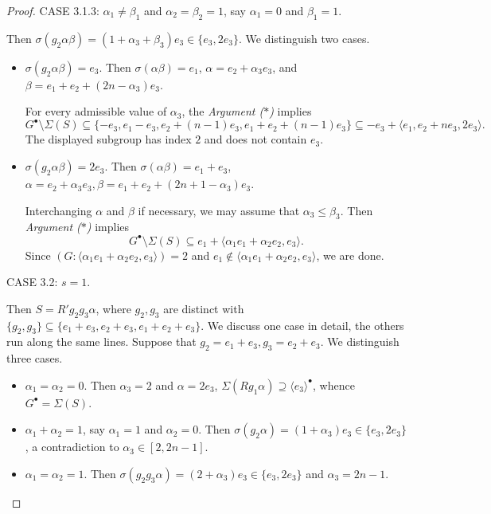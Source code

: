 \documentclass[a4paper, 10pt]{amsart}
\theoremstyle{plain}
\theoremstyle{definition}
\numberwithin{equation}{section}
\begin{document}
{\begin{proof}
\smallskip
\noindent
CASE 3.1.3:  $\alpha_1\ne \beta_1$ and $ \alpha_2= \beta_2=1$,  say $\alpha_1= 0$ and $\beta_1=1$.

Then $\sigma(g_2\alpha \beta)=(1+\alpha_3+\beta_3)e_3\in \{e_3,2e_3\}$. We distinguish two cases.
\begin{itemize}
\item[(i)] $\sigma(g_2\alpha \beta)=e_3$.  Then $\sigma(\alpha \beta)=e_1$,  $\alpha=e_2+\alpha_3e_3$, and $\beta =e_1+e_2+(2n-\alpha_3)e_3$. 

For every admissible value of $\alpha_3$, the {\it Argument ($*$)} implies
\[
G^{\bullet}\setminus\Sigma(S)
\subseteq\{-e_3,e_1-e_3,e_2+(n-1)e_3,e_1+e_2+(n-1)e_3\}
\subseteq-e_3+\langle e_1,e_2+ne_3,2e_3\rangle.
\]
The displayed subgroup has index $2$ and does not contain $e_3$.
		
\item[(ii)]  $\sigma(g_2\alpha \beta)=2e_3$. Then $\sigma(\alpha \beta)=e_1+e_3$, $\alpha=e_2+\alpha_3e_3,	\beta =e_1+e_2+(2n+1-\alpha_3)e_3$.

Interchanging $\alpha$ and $\beta$ if necessary, we may assume that $\alpha_3\le\beta_3$. Then {\it Argument ($*$)} implies
\[
G^{\bullet}\setminus\Sigma(S)
\subseteq e_1+\langle\alpha_1e_1+\alpha_2e_2,e_3\rangle.
\]
Since $(G:\langle\alpha_1e_1+\alpha_2e_2,e_3\rangle)=2$ and $e_1\notin\langle\alpha_1e_1+\alpha_2e_2,e_3\rangle$, we are done.
\end{itemize}
	
	\smallskip
	\noindent
	CASE 3.2:  $s=1$. 


Then $S=R'g_2g_3\alpha$, where $g_2, g_3$ are distinct with $\{g_2, g_3\} \subseteq  \{e_1+e_3, e_2+e_3, e_1+e_2+e_3\}$. We discuss one case in detail, the others run along the same lines. Suppose that $g_2=e_1+e_3, g_3=e_2+e_3$. We distinguish three cases.
\begin{itemize}
\item[(i)] $\alpha_1=\alpha_2= 0$. Then $\alpha_3=2$ and $\alpha=2e_3$,  $\Sigma(Rg_1\alpha)\supseteq \langle e_3\rangle^{\bullet}$, whence  $G^{\bullet}= \Sigma (S)$.
		
\item[(ii)] $\alpha_1+\alpha_2= 1$,  say $\alpha_1=1 $ and $\alpha_2= 0$. Then $\sigma(g_2\alpha)=(1+\alpha_3)e_3\in \{e_3,2e_3\}$, a contradiction to $\alpha_3 \in [2, 2n-1]$.
		
\item[(iii)] $\alpha_1=\alpha_2= 1$.  Then $\sigma(g_2g_3\alpha)=(2+\alpha_3)e_3\in \{e_3,2e_3\}$ and $\alpha_3=2n-1$.


\end{itemize}
\end{proof}}
\end{document}
